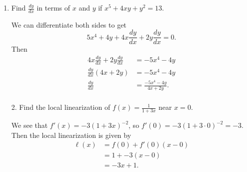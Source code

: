 \documentclass[11pt]{article}
\begin{document}
\pagestyle{empty}
\newsavebox{\quizfront}
\begin{lrbox}{\quizfront}
\begin{minipage}[top][4.5in][t]{\textwidth} \setlength{\parindent}{1.5em}
\drawtitle
\vspace{-0.5in}
\begin{enumerate}

\item Find $\frac{dy}{dx}$ in terms of $x$ and $y$ if $x^5+4xy+y^2 = 13$.

  \vfill
  {\color{blue}

    We can differentiate both sides to get
    \[
    5x^4 + 4y + 4x\frac{dy}{dx} + 2y\frac{dy}{dx} = 0.
    \]
    Then
    \begin{align*}
      4x\frac{dy}{dx} + 2y\frac{dy}{dx} &= -5x^4 - 4y\\ 
      \frac{dy}{dx}(4x + 2y) &= -5x^4 - 4y\\ 
      \frac{dy}{dx} &= \frac{-5x^4 - 4y}{4x+2y}.\\ 
    \end{align*}

  }
  \vfill

\end{enumerate}

\end{minipage}
\end{lrbox}

\newsavebox{\quizback}
\begin{lrbox}{\quizback}
\begin{minipage}[top][4.5in][t]{\textwidth} \setlength{\parindent}{1.5em}
\begin{enumerate}
\item[2.] Find the local linearization of $\displaystyle f(x) =
  \frac{1}{1+3x}$ near $x = 0$.
  \vfill
  {\color{blue}
    
    We see that $f'(x) = -3(1+3x)^{-2}$, so $f'(0) = -3(1+3\cdot0)^{-2}
    = -3$. Then the local linearization is given by
    \begin{align*}
      \ell(x) &= f(0) + f'(0)(x-0)\\
      &= 1 + -3(x-0)\\
      &= -3x + 1.
    \end{align*}

  }
  \vfill

\end{enumerate}
\end{minipage}
\end{lrbox}

\noindent \usebox{\quizfront}
\vfill
\noindent \usebox{\quizback}

\end{document}
